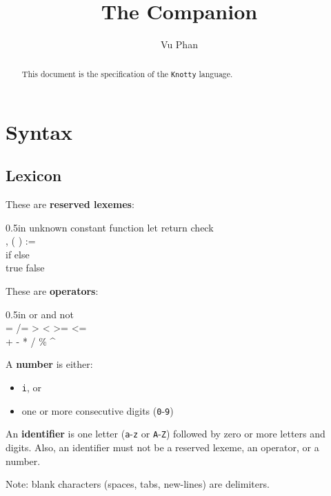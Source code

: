\documentclass[letterpaper, 12pt]{extarticle}
\title{The \kn{} Companion}
\author{Vu Phan}
\theoremstyle{definition} %
\newcommand{\textdef}[1]{\textbf{#1}}
\newcommand{\code}[1]{\texttt{#1}}
\newcommand{\kn}{\code{Knotty}}
\newenvironment{codeblock}
    {\begin{addmargin}{0.5in} \ttfamily}
    {\end{addmargin}}
\begin{document}
\maketitle

\begin{abstract}
This document is the specification of the \kn{} language.
\end{abstract}

\tableofcontents

\thispagestyle{fancy}


\newpage

\section{Syntax}


\subsection{Lexicon}

These are \textdef{reserved lexemes}:
\begin{codeblock}
unknown constant function let return check \\
, ( ) := \\
if else \\
true false
\end{codeblock}

These are \textdef{operators}:
\begin{codeblock}
or and not \\
= /= > < >= <= \\
+ - * / \% \^{}
\end{codeblock}

A \textdef{number} is either:
\begin{itemize}
\item \code{i}, or
\item one or more consecutive digits (\code{0}-\code{9})
\end{itemize}

An \textdef{identifier} is one letter
(\code{a}-\code{z} or \code{A}-\code{Z})
followed by zero or more letters and digits.
Also, an identifier must not be a reserved lexeme,
an operator, or a number.

Note: blank characters (spaces, tabs, new-lines)
are delimiters.
\end{document}
